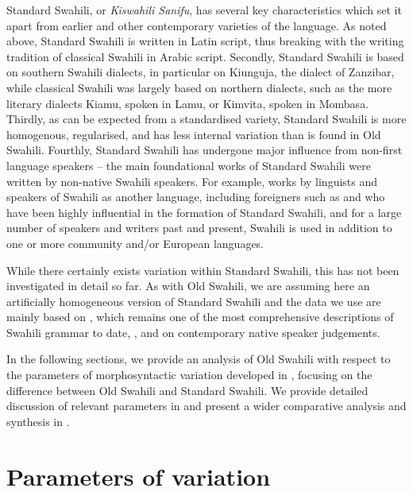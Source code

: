 \documentclass[output=paper]{langscibook}
\begin{document}
  Standard Swahili, or \textit{Kiswahili Sanifu}, has several key characteristics which set it apart from earlier and other contemporary varieties of the language. As noted above, Standard Swahili is written in Latin script, thus breaking with the writing tradition of classical Swahili in Arabic script. Secondly, Standard Swahili is based on southern Swahili dialects, in particular on Kiunguja, the dialect of Zanzibar, while classical Swahili was largely based on northern dialects, such as the more literary dialects Kiamu, spoken in Lamu, or Kimvita, spoken in Mombasa. Thirdly, as can be expected from a standardised variety, Standard Swahili is more homogenous, regularised, and has less internal variation than is found in Old Swahili. Fourthly, Standard Swahili has undergone major influence from non-first language speakers -- the main foundational works of Standard Swahili were written by non-native Swahili speakers. For example, works by linguists and speakers of Swahili as another language, including foreigners such as  \citet{Steere1870} and \citet{Ashton1947} who have been highly influential in the formation of Standard Swahili, and for a large number of speakers and writers past and present, Swahili is used in addition to one or more community and/or European languages. 

\largerpage
  While there certainly exists variation within Standard Swahili, this has not been investigated in detail so far. As with Old Swahili, we are assuming here an artificially homogeneous version of Standard Swahili and the data we use are mainly based on \citet{Ashton1947}, which remains one of the most comprehensive descriptions of Swahili grammar to date, \citet{Schadeberg1992}, and on contemporary native speaker judgements. 

In the following sections, we provide an analysis of Old Swahili with respect to the parameters of morphosyntactic variation developed in \citet{GuéroisEtAl2017}, focusing on the difference between Old Swahili and Standard Swahili. We provide detailed discussion of relevant parameters in  and present a wider comparative analysis and synthesis in .

\section{Parameters of variation}\label{sec:marten:3}
\end{document}
